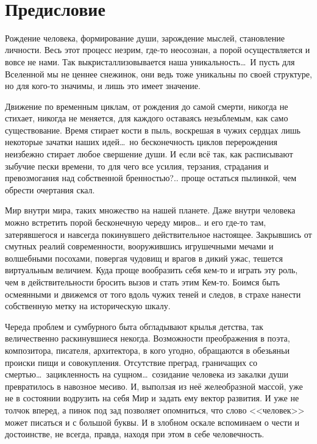 \thispagestyle{empty}
~\\
\section*{Предисловие}

Рождение человека, формирование души, зарождение мыслей, становление личности. 
Весь этот процесс незрим, где-то неосознан, а порой осуществляется и вовсе не 
нами. Так выкристаллизовывается наша уникальность\dots\ И пусть для Вселенной 
мы не ценнее снежинок, они ведь тоже уникальны по своей структуре, но для 
кого-то значимы, и лишь это имеет значение.

Движение по временным циклам, от рождения до самой смерти, никогда не стихает, 
никогда не меняется, для каждого оставаясь незыблемым, как само существование. 
Время стирает кости в пыль, воскрешая в чужих сердцах лишь некоторые зачатки 
наших идей\dots\ но бесконечность циклов перерождения неизбежно стирает любое 
свершение души. И если всё так, как расписывают зыбучие пески времени, то для 
чего все усилия, терзания, страдания и превозмогания над собственной бренностью?.. 
проще остаться пылинкой, чем обрести очертания скал.

Мир внутри мира, таких множество на нашей планете. Даже внутри человека можно 
встретить порой бесконечную череду миров… и его где-то там, затерявшегося и 
навсегда покинувшего действительное настоящее. Закрывшись от смутных реалий 
современности, вооружившись игрушечными мечами и волшебными посохами, повергая 
чудовищ и врагов в дикий ужас, тешется виртуальным величием. Куда проще 
вообразить себя кем-то и играть эту роль, чем в действительности бросить вызов и 
стать этим Кем-то. Боимся быть осмеянными и движемся от того вдоль чужих теней и 
следов, в страхе нанести собственную метку на историческую шкалу.

Череда проблем и сумбурного быта обгладывают крылья детства, так величественно 
раскинувшиеся некогда. Возможности преображения в поэта, 
композитора, писателя, архитектора, в кого угодно, обращаются в обезьяньи 
происки пищи и совокупления. Отсутствие преград, граничащих со смертью\dots\ 
зацикленность на сущном\dots\ созидание человека из закалки души превратилось в 
навозное месиво. 
\newpage
\thispagestyle{empty}
\noindent И, выползая из неё желеобразной массой, уже не в состоянии 
водрузить на себя Мир и задать ему вектор развития. И уже не толчок вперед, а 
пинок под зад позволяет опомниться, что слово <<человек>> может писаться и с 
большой буквы. И в злобном оскале вспоминаем о чести и достоинстве, не всегда, 
правда, находя при этом в себе человечность. 

